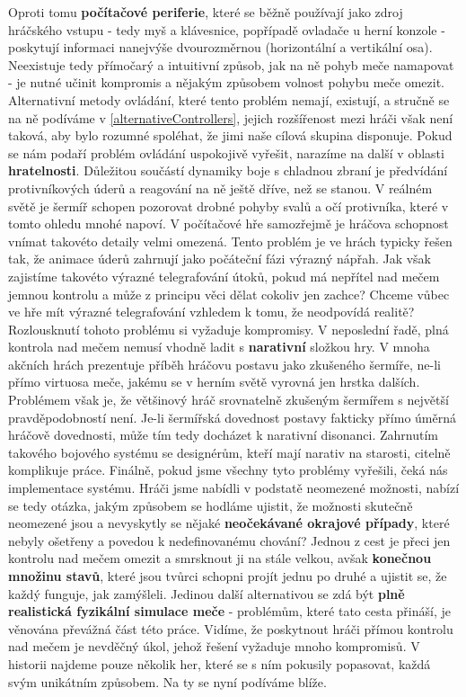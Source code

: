 Oproti tomu \textbf{počítačové periferie}, které se běžně používají jako zdroj hráčského vstupu - tedy myš a klávesnice, popřípadě ovladače u herní konzole - poskytují informaci nanejvýše dvourozměrnou (horizontální a vertikální osa). Neexistuje tedy přímočarý a intuitivní způsob, jak na ně pohyb meče namapovat - je nutné učinit kompromis a nějakým způsobem volnost pohybu meče omezit. Alternativní metody ovládání, které tento problém nemají, existují, a stručně se na ně podíváme v \ref{alternativeControllers}, jejich rozšířenost mezi hráči však není taková, aby bylo rozumné spoléhat, že jimi naše cílová skupina disponuje.
\bigbreak
Pokud se nám podaří problém ovládání uspokojivě vyřešit, narazíme na další v oblasti \textbf{hratelnosti}. Důležitou součástí dynamiky boje s chladnou zbraní je předvídání protivníkových úderů a reagování na ně ještě dříve, než se stanou. V reálném světě je šermíř schopen pozorovat drobné pohyby svalů a očí protivníka, které v tomto ohledu mnohé napoví. V počítačové hře samozřejmě je hráčova schopnost vnímat takovéto detaily velmi omezená. Tento problém je ve hrách typicky řešen tak, že animace úderů zahrnují jako počáteční fázi výrazný nápřah. Jak však zajistíme takovéto výrazné telegrafování útoků, pokud má nepřítel nad mečem jemnou kontrolu a může z principu věci dělat cokoliv jen zachce? Chceme vůbec ve hře mít výrazné telegrafování vzhledem k tomu, že neodpovídá realitě? Rozlousknutí tohoto problému si vyžaduje kompromisy.
\bigbreak
V neposlední řadě, plná kontrola nad mečem nemusí vhodně ladit s \textbf{narativní} složkou hry. V mnoha akčních hrách prezentuje příběh hráčovu postavu jako zkušeného šermíře, ne-li přímo virtuosa meče, jakému se v herním světě vyrovná jen hrstka dalších. Problémem však je, že většinový hráč srovnatelně zkušeným šermířem s největší pravděpodobností není. Je-li šermířská dovednost postavy fakticky přímo úměrná hráčově dovednosti, může tím tedy docházet k narativní disonanci. Zahrnutím takového bojového systému se designérům, kteří mají narativ na starosti, citelně komplikuje práce. 
\bigbreak
Finálně, pokud jsme všechny tyto problémy vyřešili, čeká nás implementace systému. Hráči jsme nabídli v podstatě neomezené možnosti, nabízí se tedy otázka, jakým způsobem se hodláme ujistit, že možnosti skutečně neomezené jsou a nevyskytly se nějaké \textbf{neočekávané okrajové případy}, které nebyly ošetřeny a povedou k nedefinovanému chování? Jednou z cest je přeci jen kontrolu nad mečem omezit a smrsknout ji na stále velkou, avšak \textbf{konečnou množinu stavů}, které jsou tvůrci schopni projít jednu po druhé a ujistit se, že každý funguje, jak zamýšleli. Jedinou další alternativou se zdá být \textbf{plně realistická fyzikální simulace meče} - problémům, které tato cesta přináší, je věnována převážná část této práce.  
\bigbreak
Vidíme, že poskytnout hráči přímou kontrolu nad mečem je nevděčný úkol, jehož řešení vyžaduje mnoho kompromisů. V historii najdeme pouze několik her, které se s ním pokusily popasovat, každá svým unikátním způsobem. Na ty se nyní podíváme blíže.

